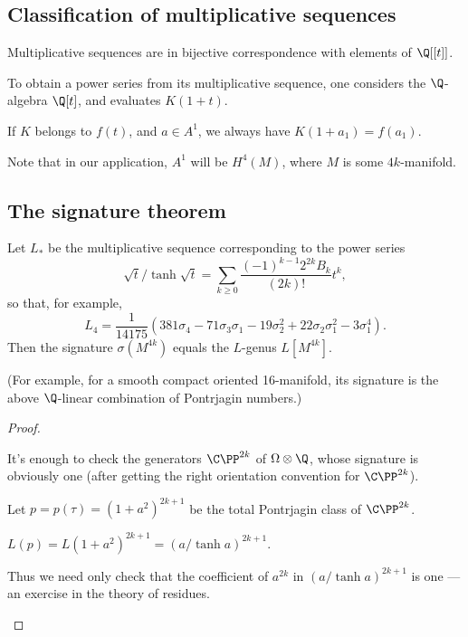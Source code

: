 \documentclass[11pt]{article}
\begin{document}
\begin{SignatureThmTalk}
\subsection*{Classification of multiplicative sequences}
\begin{lem*}[Hirzebruch]\hfil
\begin{itemise}
\item Multiplicative sequences are in bijective correspondence with elements of $\Q[[t]]$.
\item To obtain a power series from its multiplicative sequence, one considers the $\Q$-algebra $\Q[t]$, and evaluates $K(1+t)$.
\item If $K$ belongs to $f(t)$, and $a\in A^1$, we always have $K(1+a_1)=f(a_1)$.
\end{itemise}
\end{lem*}
\noindent Note that in our application, $A^1$ will be $H^4(M)$, where $M$ is some $4k$-manifold.
\subsection*{The signature theorem}
\begin{thm*}
Let $L_*$ be the multiplicative sequence corresponding to the power series
\[\sqrt t/\tanh\sqrt t=\sum_{k\geq0}\frac{(-1)^{k-1} 2^{2k}B_k}{(2k)!}t^k,\]
so that, for example,
\[L_4=\frac{1}{14175}\left(381\sigma_4-71\sigma_3\sigma_1
-19\sigma_2^2+22 \sigma_2\sigma_1^2-3\sigma_1^4\right).\]
Then the signature $\sigma(M^{4k})$ equals the $L$-genus $L[M^{4k}]$.
\end{thm*}
\noindent(For example, for a smooth compact oriented 16-manifold, its signature is the above $\Q$-linear combination of Pontrjagin numbers.)
\begin{proof}\hfil
\begin{itemise}
\item It's enough to check the generators $\CP^{2k}$ of $\Omega\otimes\Q$, whose signature is obviously one (after getting the right orientation convention for $\CP^{2k}$).
\item Let $p=p(\tau)=(1+a^2)^{2k+1}$ be the total Pontrjagin class of $\CP^{2k}$.
\item $L(p)=L(1+a^2)^{2k+1}=(a/\tanh a)^{2k+1}$.
\item Thus we need only check that the coefficient of $a^{2k}$ in $(a/\tanh a)^{2k+1}$ is one --- an exercise in the theory of residues.\qedhere
\end{itemise}
\end{proof}

\pagebreak
\end{SignatureThmTalk}
\end{document}
